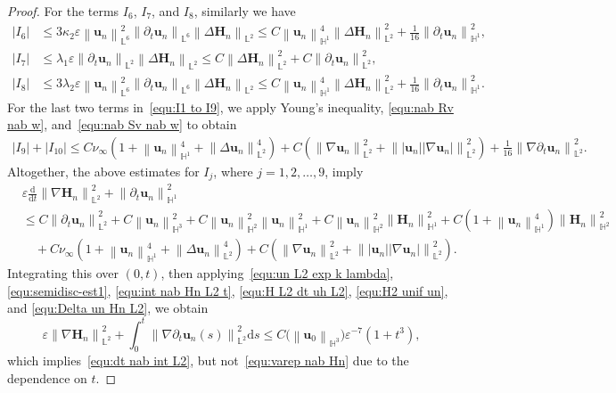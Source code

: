 \documentclass[11pt, reqno]{amsart}
\theoremstyle{definition}
\numberwithin{equation}{section}
\newcommand{\bff}{\boldsymbol}
\newcommand{\bb}{\mathbb}
\newcommand{\ddt}{\frac{\mathrm{d}}{\mathrm{d}t}}
\newcommand{\ds}{\mathrm{d}s}
\newcommand{\norm}[2]{\left\|{#1}\right\|_{#2}}
\newcommand{\abs}[1]{\left|{#1}\right|}
\begin{document}
\begin{proof}
For the terms $I_6$, $I_7$, and $I_8$, similarly we have
\begin{align*}
    \abs{I_6}
    &\leq
    3\kappa_2 \varepsilon \norm{\bff{u}_n}{\bb{L}^6}^2 \norm{\partial_t \bff{u}_n}{\bb{L}^6} \norm{\Delta \bff{H}_n}{\bb{L}^2}
    \leq
    C\norm{\bff{u}_n}{\bb{H}^1}^4 \norm{\Delta \bff{H}_n}{\bb{L}^2}^2
    +
    \frac{1}{16} \norm{\partial_t \bff{u}_n}{\bb{H}^1}^2,
    \\
    \abs{I_7}
    &\leq
    \lambda_1\varepsilon \norm{\partial_t \bff{u}_n}{\bb{L}^2} \norm{\Delta \bff{H}_n}{\bb{L}^2}
    \leq
    C\norm{\Delta \bff{H}_n}{\bb{L}^2}^2
    +
    C \norm{\partial_t \bff{u}_n}{\bb{L}^2}^2,
    \\
    \abs{I_8}
    &\leq
    3\lambda_2\varepsilon \norm{\bff{u}_n}{\bb{L}^6}^2 \norm{\partial_t \bff{u}_n}{\bb{L}^6} \norm{\Delta \bff{H}_n}{\bb{L}^2}
    \leq
    C\norm{\bff{u}_n}{\bb{H}^1}^4 \norm{\Delta \bff{H}_n}{\bb{L}^2}^2
    +
    \frac{1}{16} \norm{\partial_t \bff{u}_n}{\bb{H}^1}^2.
\end{align*}
For the last two terms in~\eqref{equ:I1 to I9}, we apply Young's inequality, \eqref{equ:nab Rv nab w}, and~\eqref{equ:nab Sv nab w} to obtain
\begin{align*}
    \abs{I_9}+\abs{I_{10}}
    \leq
    C \nu_\infty\left(1+\norm{\bff{u}_n}{\bb{H}^1}^4 + \norm{\Delta \bff{u}_n}{\bb{L}^2}^4 \right)
    +
    C \left(\norm{\nabla \bff{u}_n}{\bb{L}^2}^2 + \norm{|\bff{u}_n| |\nabla \bff{u}_n|}{\bb{L}^2}^2 \right)
    +
    \frac{1}{16} \norm{\nabla\partial_t \bff{u}_n}{\bb{L}^2}^2.
\end{align*}
Altogether, the above estimates for $I_j$, where $j=1,2,\ldots,9$, imply
\begin{align}\label{equ:e ddt nab Hn}
    &\varepsilon \ddt \norm{\nabla \bff{H}_n}{\bb{L}^2}^2
    +
    \norm{\partial_t \bff{u}_n}{\bb{H}^1}^2
    \nonumber\\
    &\leq
    C\norm{\partial_t \bff{u}_n}{\bb{L}^2}^2 + C\norm{\bff{u}_n}{\bb{H}^3}^2
    +
    C\norm{\bff{u}_n}{\bb{H}^2}^2 \norm{\bff{u}_n}{\bb{H}^1}^2
    +
    C\norm{\bff{u}_n}{\bb{H}^2}^2 \norm{\bff{H}_n}{\bb{H}^1}^2
    +
    C\left(1+\norm{\bff{u}_n}{\bb{H}^1}^4 \right) \norm{\bff{H}_n}{\bb{H}^2}^2
    \nonumber \\
    &\quad
    +
    C \nu_\infty\left(1+\norm{\bff{u}_n}{\bb{H}^1}^4 + \norm{\Delta \bff{u}_n}{\bb{L}^2}^4 \right)
    +
    C \left(\norm{\nabla \bff{u}_n}{\bb{L}^2}^2 + \norm{|\bff{u}_n| |\nabla \bff{u}_n|}{\bb{L}^2}^2 \right).
\end{align}
Integrating this over $(0,t)$, then applying~\eqref{equ:un L2 exp k lambda}, \eqref{equ:semidisc-est1}, \eqref{equ:int nab Hn L2 t}, \eqref{equ:H L2 dt uh L2}, \eqref{equ:H2 unif un}, and \eqref{equ:Delta un Hn L2}, we obtain
\begin{equation}\label{equ:eps nab Hn dt}
    \varepsilon \norm{\nabla \bff{H}_n}{\bb{L}^2}^2
    +
    \int_0^t \norm{\nabla\partial_t \bff{u}_n(s)}{\bb{L}^2}^2 \ds
    \leq
    C \big(\norm{\bff{u}_0}{\bb{H}^3}\big)  \varepsilon^{-7} \left(1+t^3 \right) ,
\end{equation}
which implies~\eqref{equ:dt nab int L2}, but not~\eqref{equ:varep nab Hn} due to the dependence on $t$.


\end{proof}
\end{document}
